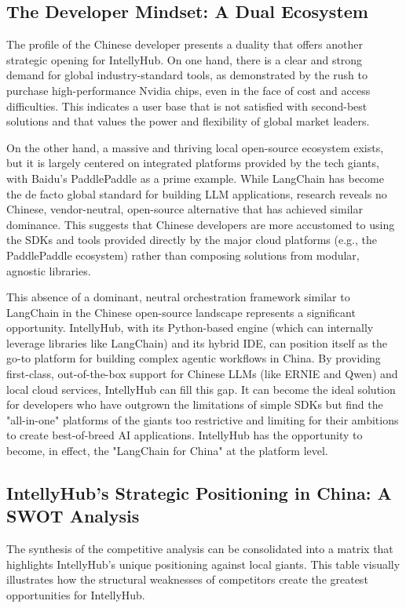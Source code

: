 \documentclass[11pt, a4paper, oneside]{article}
\begin{document}
\subsection{The Developer Mindset: A Dual Ecosystem}
The profile of the Chinese developer presents a duality that offers another strategic opening for IntellyHub. On one hand, there is a clear and strong demand for global industry-standard tools, as demonstrated by the rush to purchase high-performance Nvidia chips, even in the face of cost and access difficulties\cite{NvidiaPreference}. This indicates a user base that is not satisfied with second-best solutions and that values the power and flexibility of global market leaders.

On the other hand, a massive and thriving local open-source ecosystem exists, but it is largely centered on integrated platforms provided by the tech giants, with Baidu's PaddlePaddle as a prime example\cite{PaddlePaddleDevs, PaddlePaddleEcosystem}. While LangChain has become the de facto global standard for building LLM applications\cite{IntellyHubBP}, research reveals no Chinese, vendor-neutral, open-source alternative that has achieved similar dominance\cite{LangChainAlternatives, AIAgentFrameworks, ChineseLLMs}. This suggests that Chinese developers are more accustomed to using the SDKs and tools provided directly by the major cloud platforms (e.g., the PaddlePaddle ecosystem) rather than composing solutions from modular, agnostic libraries.

This absence of a dominant, neutral orchestration framework similar to LangChain in the Chinese open-source landscape represents a significant opportunity. IntellyHub, with its Python-based engine (which can internally leverage libraries like LangChain) and its hybrid IDE, can position itself as the go-to platform for building complex agentic workflows in China. By providing first-class, out-of-the-box support for Chinese LLMs (like ERNIE and Qwen) and local cloud services, IntellyHub can fill this gap. It can become the ideal solution for developers who have outgrown the limitations of simple SDKs but find the "all-in-one" platforms of the giants too restrictive and limiting for their ambitions to create best-of-breed AI applications. IntellyHub has the opportunity to become, in effect, the "LangChain for China" at the platform level.

\subsection{IntellyHub's Strategic Positioning in China: A SWOT Analysis}
The synthesis of the competitive analysis can be consolidated into a matrix that highlights IntellyHub's unique positioning against local giants. This table visually illustrates how the structural weaknesses of competitors create the greatest opportunities for IntellyHub.
\end{document}
